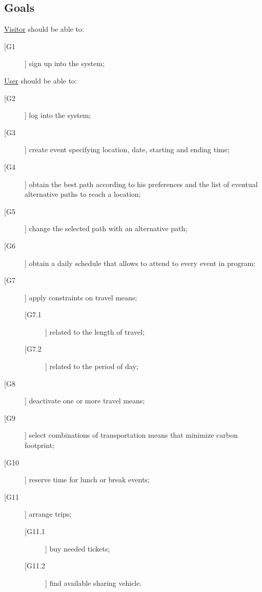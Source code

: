\subsection{Goals}
\underline{Visitor} should be able to:
\begin{description}
\item [[G1]] sign up into the system;
\end{description}

\noindent\underline{User} should be able to:
\begin{description}
\item[[G2]] log into the system;
\item[[G3]] create event specifying location, date, starting and ending time;
\item[[G4]] obtain the best path according to his preferences and the list of eventual alternative paths to reach a location;
\item[[G5]] change the selected path with an alternative path; 
\item[[G6]] obtain a daily schedule that allows to attend to every event in program;
\item[[G7]] apply constraints on travel means;
	\begin{description}
	\item[[G7.1]] related to the length of travel;
	\item[[G7.2]] related to the period of day;
	\end{description}
\item[[G8]] deactivate one or more travel means;
\item[[G9]] select combinations of transportation means that minimize carbon footprint;
\item[[G10]] reserve time for lunch or break events;
\item[[G11]] arrange trips;
	\begin{description}
	\item[[G11.1]] buy needed tickets;
	\item[[G11.2]] find available sharing vehicle.
	\end{description}
\end{description}
